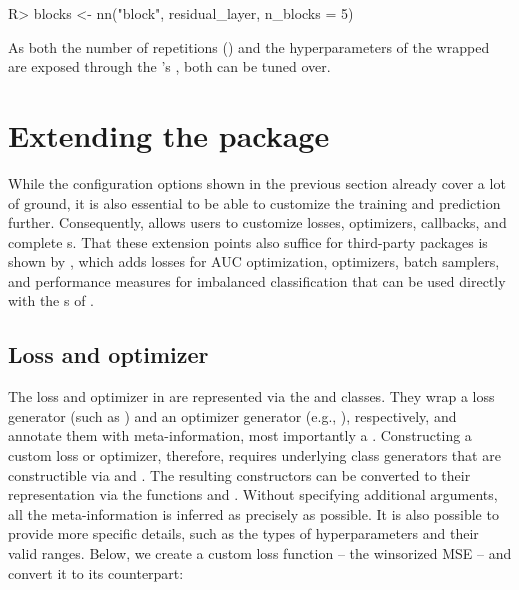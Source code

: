 \documentclass[article,shortnames]{jss}
\theoremstyle{definition}
\renewenvironment{CodeChunk}{\par\addvspace{0.6\baselineskip}\noindent\begin{minipage}{\linewidth}}{\end{minipage}\par\vspace{0.6\baselineskip}}
\begin{document}
\begin{CodeChunk}
\begin{CodeInput}
R> blocks <- nn("block", residual_layer, n_blocks = 5)
\end{CodeInput}
\end{CodeChunk}

As both the number of repetitions () and the hyperparameters of the wrapped  are exposed through the 's , both can be tuned over.


\section{Extending the package}\label{sec:extending}

While the configuration options shown in the previous section already cover a lot of ground, it is also essential to be able to customize the training and prediction further.
Consequently,  allows users to customize losses, optimizers, callbacks, and complete s.
That these extension points also suffice for third-party packages is shown by  \citep{ref-mlr3torchAUM}, which adds losses for AUC optimization, optimizers, batch samplers, and performance measures for imbalanced classification that can be used directly with the s of \mlrttorch{}.

\subsection{Loss and optimizer}\label{sec:extending-loss-opt}

The loss and optimizer in \mlrttorch{} are represented via the  and  classes.
They wrap a loss generator (such as ) and an optimizer generator (e.g., ), respectively, and annotate them with meta-information, most importantly a .
Constructing a custom loss or optimizer, therefore, requires underlying class generators that are constructible via  and .
The resulting constructors can be converted to their \mlrttorch{} representation via the functions  and .
Without specifying additional arguments, all the meta-information is inferred as precisely as possible.
It is also possible to provide more specific details, such as the types of hyperparameters and their valid ranges.
Below, we create a custom  loss function -- the winsorized MSE -- and convert it to its \mlrttorch{} counterpart:
\end{document}
